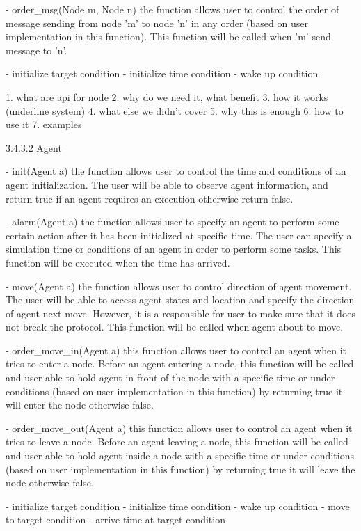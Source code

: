 \begin{description}
\begin{description}
\begin{description}
\begin{description}
- order_msg(Node m, Node n) the function allows user to control the order of message sending from node 'm' to node 'n' in any order (based on user implementation in this function). This function will be called when 'm' send message to 'n'.


- initialize target condition
- initialize time condition
- wake up condition

1. what are api for node
2. why do we need it, what benefit
3. how it works (underline system)
4. what else we didn't cover
5. why this is enough
6. how to use it
7. examples


3.4.3.2 Agent

- init(Agent a) the function allows user to control the time and conditions of an agent initialization. The user will be able to observe agent information, and return true if an agent requires an execution otherwise return false.

- alarm(Agent a) the function allows user to specify an agent to perform some certain action after it has been initialized at specific time. The user can specify a simulation time or conditions of an agent in order to perform some tasks. This function will be executed when the time has arrived.

- move(Agent a) the function allows user to control direction of agent movement. The user will be able to access agent states and location and specify the direction of agent next move. However, it is a responsible for user to make sure that it does not break the protocol. This function will be called when agent about to move.
	
- order_move_in(Agent a) this function allows user to control an agent when it tries to enter a node. Before an agent entering a node, this function will be called and user able to hold agent in front of the node with a specific time or under conditions (based on user implementation in this function) by returning true it will enter the node otherwise false.

- order_move_out(Agent a) this function allows user to control an agent when it tries to leave a node. Before an agent leaving a node, this function will be called and user able to hold agent inside a node with a specific time or under conditions (based on user implementation in this function) by returning true it will leave the node otherwise false.


- initialize target condition
- initialize time condition
- wake up condition
- move to target condition
- arrive time at target condition


\end{description}
\end{description}
\end{description}
\end{description}
